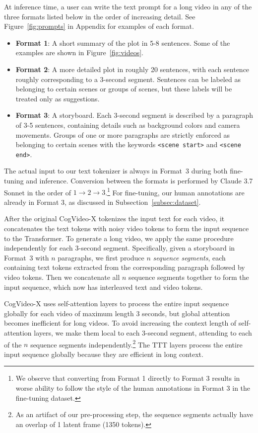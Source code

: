 At inference time, a user can write the text prompt for a long video in any of the three formats listed below in the order of increasing detail.
See Figure~\ref{fig:prompts} in Appendix for examples of each format.
\vspace{0.2em}
\begin{itemize}[itemsep=0.2em]
    \item \textbf{Format 1}: A short summary of the plot in 5-8 sentences. Some of the examples are shown in Figure~\ref{fig:videos}.
    \item \textbf{Format 2}: A more detailed plot in roughly 20 sentences, with each sentence roughly corresponding to a 3-second segment. 
    Sentences can be labeled as belonging to certain scenes or groups of scenes, but these labels will be treated only as suggestions.
    \item \textbf{Format 3}: A storyboard. Each 3-second segment is described by a paragraph of 3-5 sentences, containing details such as background colors and camera movements. Groups of one or more paragraphs are strictly enforced as belonging to certain scenes with the keywords \mbox{\texttt{<scene start>}} and \texttt{<scene end>}.
\end{itemize}
The actual input to our text tokenizer is always in Format~3 during both fine-tuning and inference.
Conversion between the formats is performed by Claude 3.7 Sonnet in the order of $1\rightarrow2\rightarrow3$.\footnote{We observe that converting from Format 1 directly to Format 3 results in worse ability to follow the style of the human annotations in Format 3 in the fine-tuning dataset.}
For fine-tuning, our human annotations are already in Format 3, as discussed in Subsection~\ref{subsec:dataset}.

After the original CogVideo-X tokenizes the input text for each video, it concatenates the text tokens with noisy video tokens to form the input sequence to the Transformer.
To generate a long video, we apply the same procedure independently for each 3-second segment.
Specifically, given a storyboard in Format~3 with $n$ paragraphs, we first produce $n$ \emph{sequence segments}, each containing text tokens extracted from the corresponding paragraph followed by video tokens.
Then we concatenate all $n$ sequence segments together to form the input sequence, which now has interleaved text and video tokens.

\mbox{CogVideo-X} uses self-attention layers to process the entire input sequence globally for each video of maximum length 3 seconds, but global attention becomes inefficient for long videos.
To avoid increasing the context length of self-attention layers, we make them local to each 3-second segment, attending to each of the $n$ sequence segments independently.\footnote{As an artifact of our pre-processing step, the sequence segments actually have an overlap of 1 latent frame (1350 tokens).}
The TTT layers process the entire input sequence globally because they are efficient in long context.

